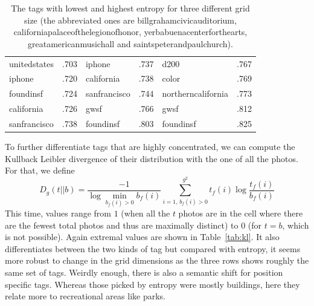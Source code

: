 \begin{table}[ht]
\begin{tabular}{lclclc}
unitedstates     & .703 & iphone                 & .737 & d200                & .767 \\
iphone           & .720 & california             & .738 & color               & .769 \\
foundinsf        & .724 & sanfrancisco           & .744 & northerncalifornia  & .773 \\
california       & .726 & gwsf                   & .766 & gwsf                & .812 \\
sanfrancisco     & .738 & foundinsf              & .803 & foundinsf           & .825 \\
\bottomrule
\end{tabular}
\caption{The tags with lowest and highest entropy for three different grid
	size (the abbreviated ones are \textsf{billgrahamcivicauditorium},
	\textsf{californiapalaceofthelegionofhonor},
	\textsf{yerbabuenacenterforthearts}, \textsf{greatamericanmusichall} and
\textsf{saintspeterandpaulchurch}).\label{tab:entropy}}
\end{table}

To further differentiate tags that are highly concentrated, we can compute the
Kullback Leibler divergence of their distribution with the one of all the
photos. For that, we define \[D_g(t||b) = \frac{-1}{\log
	\min_{b_f(i)>0}b_f(i)}\sum_{i=1,\, b_f(i)>0}^{g^2} t_f(i)\log
\frac{t_f(i)}{b_f(i)}\] This time, values range from $1$ (when all the $t$
photos are in the cell where there are the fewest total photos and thus are
maximally distinct) to $0$ (for $t=b$, which is not possible). Again extremal
values are shown in Table~\vref{tab:kl}. It also differentiates between the
two kinds of tag but compared with entropy, it seems more robust to change in
the grid dimensions as the three rows shows roughly the same set of tags.
Weirdly enough, there is also a semantic shift for position specific tags.
Whereas those picked by entropy were mostly buildings, here they relate more to
recreational areas like parks.

